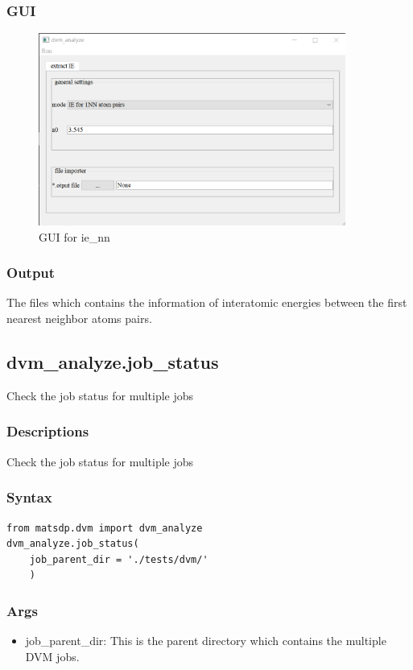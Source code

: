 \documentclass[12pt]{book}
\begin{document}
\subsubsection{GUI}
\begin{figure}[htbp]
\centering
\includegraphics[width=0.9\textwidth]{gui_ie_nn.pdf}
\caption{GUI for ie\_nn}
\label{fig:GUI_ie_nn}
\end{figure}

\subsubsection{Output}

The files which contains the information of interatomic energies between the first nearest neighbor atoms pairs.

\subsection{dvm\_analyze.job\_status}
Check the job status for multiple jobs

\subsubsection{Descriptions}
Check the job status for multiple jobs
\subsubsection{Syntax}
\begin{lstlisting}
from matsdp.dvm import dvm_analyze
dvm_analyze.job_status(
    job_parent_dir = './tests/dvm/'
    )
\end{lstlisting}
\subsubsection{Args}
\begin{itemize}
\item job\_parent\_dir: This is the parent directory which contains the multiple DVM jobs.
\end{itemize}
\end{document}
